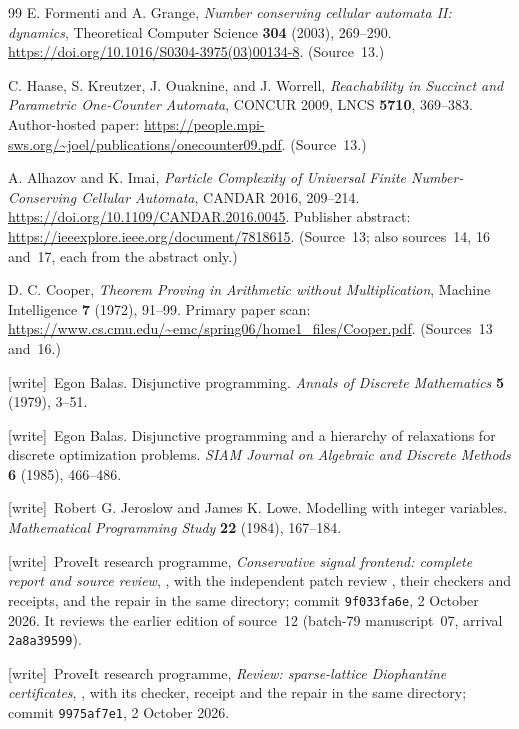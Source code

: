 \documentclass[11pt,letterpaper]{article}
\numberwithin{equation}{section}
\theoremstyle{definition}
\theoremstyle{remark}
\newcommand{\wtag}{\textup{[write]}}
\begin{document}
\begin{thebibliography}{99}
E. Formenti and A. Grange, \emph{Number conserving cellular automata II: dynamics}, Theoretical Computer Science \textbf{304} (2003), 269--290. \url{https://doi.org/10.1016/S0304-3975(03)00134-8}.
(Source~13.)

C. Haase, S. Kreutzer, J. Ouaknine, and J. Worrell, \emph{Reachability in Succinct and Parametric One-Counter Automata}, CONCUR 2009, LNCS \textbf{5710}, 369--383. Author-hosted paper: \url{https://people.mpi-sws.org/~joel/publications/onecounter09.pdf}.
(Source~13.)

A. Alhazov and K. Imai, \emph{Particle Complexity of Universal Finite Number-Conserving Cellular Automata}, CANDAR 2016, 209--214. \url{https://doi.org/10.1109/CANDAR.2016.0045}. Publisher abstract: \url{https://ieeexplore.ieee.org/document/7818615}.
(Source~13; also sources~14, 16 and~17, each from the abstract only.)

D. C. Cooper, \emph{Theorem Proving in Arithmetic without Multiplication}, Machine Intelligence \textbf{7} (1972), 91--99. Primary paper scan: \url{https://www.cs.cmu.edu/~emc/spring06/home1_files/Cooper.pdf}.
(Sources~13 and~16.)

\wtag\ Egon Balas. Disjunctive programming. \emph{Annals of Discrete Mathematics} \textbf{5} (1979), 3--51.

\wtag\ Egon Balas. Disjunctive programming and a hierarchy of relaxations for discrete optimization problems. \emph{SIAM Journal on Algebraic and Discrete Methods} \textbf{6} (1985), 466--486.

\wtag\ Robert G. Jeroslow and James K. Lowe. Modelling with integer variables. \emph{Mathematical Programming Study} \textbf{22} (1984), 167--184.

\wtag\ ProveIt research programme, \emph{Conservative signal frontend: complete report and source review}, , with the independent patch review , their checkers and receipts, and the repair  in the same directory; commit \texttt{9f033fa6e}, 2 October 2026. It reviews the earlier edition of source~12 (batch-79 manuscript~07, arrival \texttt{2a8a39599}).

\wtag\ ProveIt research programme, \emph{Review: sparse-lattice Diophantine certificates}, , with its checker, receipt and the repair  in the same directory; commit \texttt{9975af7e1}, 2 October 2026.


\end{thebibliography}
\end{document}
